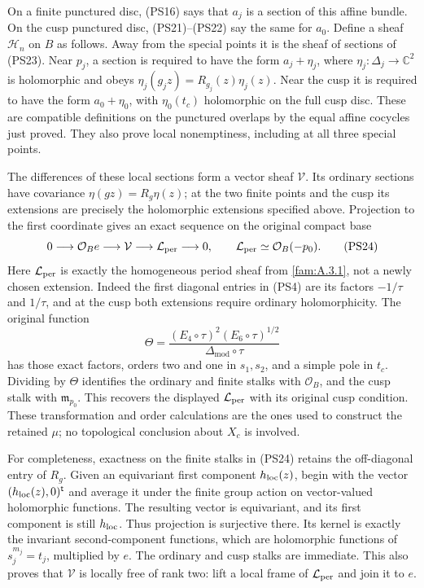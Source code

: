 \documentclass[11pt,a4paper]{article}
\theoremstyle{plain}
\theoremstyle{definition}
\begin{document}
On a finite punctured disc, (PS16) says that $a_j$ is a section of
this affine bundle. On the cusp punctured disc, (PS21)--(PS22) say
the same for $a_0$. Define a sheaf $\mathscr H_n$ on $B$ as follows.
Away from the special points it is the sheaf of sections of (PS23).
Near $p_j$, a section is required to have the form $a_j+\eta_j$,
where $\eta_j:\Delta_j\to\mathbb C^2$ is holomorphic and obeys
$\eta_j(g_jz)=R_{g_j}(z)\eta_j(z)$. Near the cusp it is required
to have the form $a_0+\eta_0$, with $\eta_0(t_c)$ holomorphic on
the full cusp disc. These are compatible definitions on the punctured
overlaps by the equal affine cocycles just proved. They also prove
local nonemptiness, including at all three special points.

The differences of these local sections form a vector sheaf
$\mathcal V$. Its ordinary sections have covariance $\eta(gz)=R_g\eta(z)$;
at the two finite points and the cusp its extensions are precisely
the holomorphic extensions specified above. Projection to the first
coordinate gives an exact sequence on the original compact base
\[
 0\longrightarrow\mathcal O_B e\longrightarrow\mathcal V
        \longrightarrow\mathcal L_{\rm per}\longrightarrow0,
                  \qquad \mathcal L_{\rm per}\simeq\mathcal O_B(-p_0).
 \tag{PS24}\label{pshift:eq:vector-sheaf}
\]
Here $\mathcal L_{\rm per}$ is exactly the homogeneous period sheaf from
\cref{fam:A.3.1}, not a newly chosen extension. Indeed
the first diagonal entries in (PS4) are its factors $-1/\tau$ and
$1/\tau$, and at the cusp both extensions require ordinary
holomorphicity. The original function
\[
 \Theta=\frac{(E_4\circ\tau)^2(E_6\circ\tau)^{1/2}}
                 {\Delta_{\mathrm{mod}}\circ\tau}
\]
has those exact factors, orders two and one in $s_1,s_2$, and a
simple pole in $t_c$. Dividing by $\Theta$ identifies the ordinary
and finite stalks with $\mathcal O_B$, and the cusp stalk with
$\mathfrak m_{p_0}$. This recovers the displayed $\mathcal L_{\rm per}$
with its original cusp condition. These transformation and order
calculations are the ones used to construct the retained $\mu$;
no topological conclusion about $X_c$ is involved.

For completeness, exactness on the finite stalks in (PS24) retains
the off-diagonal entry of $R_g$. Given an equivariant first component
$h_{\rm loc}(z)$, begin with the vector $(h_{\rm loc}(z),0)^{\mathsf t}$ and average it
under the finite group action on vector-valued holomorphic functions.
The resulting vector is equivariant, and its first component is
still $h_{\rm loc}$. Thus projection is surjective there. Its kernel is
exactly the invariant second-component functions, which are
holomorphic functions of $s_j^{m_j}=t_j$, multiplied by $e$.
The ordinary and cusp stalks are immediate. This also proves that
$\mathcal V$ is locally free of rank two: lift a local frame of
$\mathcal L_{\rm per}$ and join it to $e$.
\end{document}

